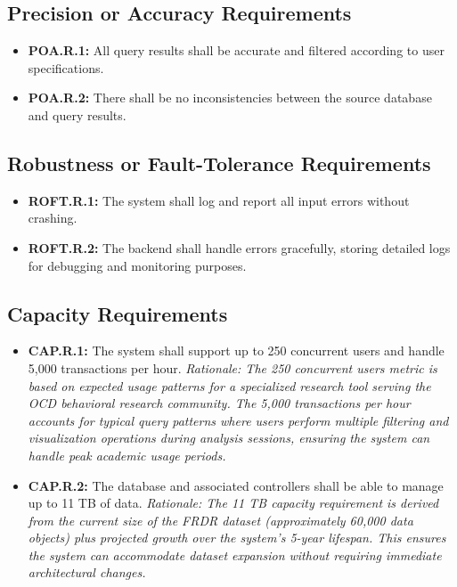 \documentclass[12pt]{article}
\begin{document}
\subsection{Precision or Accuracy Requirements}
\begin{itemize}
    \item \textbf{POA.R.1:}\label{req:poa.r.1} All query results shall be accurate and filtered according to user specifications.
    \item \textbf{POA.R.2:}\label{req:poa.r.2} There shall be no inconsistencies between the source database and query results.
\end{itemize}

\subsection{Robustness or Fault-Tolerance Requirements}
\begin{itemize}
    \item \textbf{ROFT.R.1:}\label{req:roft.r.1} The system shall log and report all input errors without crashing.
    \item \textbf{ROFT.R.2:}\label{req:roft.r.2} The backend shall handle errors gracefully, storing detailed logs for debugging and monitoring purposes.
\end{itemize}

\subsection{Capacity Requirements}
\begin{itemize}
    \item \textbf{CAP.R.1:}\label{req:cap.r.1} The system shall support up to 250 concurrent users and handle 5,000 transactions per hour. \textit{Rationale: The 250 concurrent users metric is based on expected usage patterns for a specialized research tool serving the OCD behavioral research community. The 5,000 transactions per hour accounts for typical query patterns where users perform multiple filtering and visualization operations during analysis sessions, ensuring the system can handle peak academic usage periods.}
    \item \textbf{CAP.R.2:}\label{req:cap.r.2} The database and associated controllers shall be able to manage up to 11 TB of data. \textit{Rationale: The 11 TB capacity requirement is derived from the current size of the FRDR dataset (approximately 60,000 data objects) plus projected growth over the system's 5-year lifespan. This ensures the system can accommodate dataset expansion without requiring immediate architectural changes.}
\end{itemize}
\end{document}
